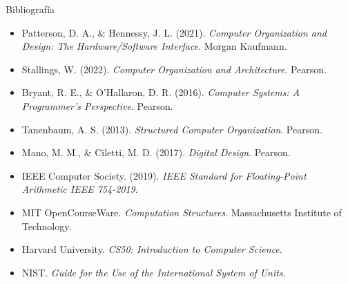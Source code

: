 \documentclass[10pt, aspectratio=169]{beamer}
\begin{document}
	\begin{frame}{Bibliografía}
		
		\tiny
		
		\begin{itemize}
			
			\item Patterson, D. A., \& Hennessy, J. L. (2021). \textit{Computer Organization and Design: The Hardware/Software Interface}. Morgan Kaufmann.
			
			\item Stallings, W. (2022). \textit{Computer Organization and Architecture}. Pearson.
			
			\item Bryant, R. E., \& O'Hallaron, D. R. (2016). \textit{Computer Systems: A Programmer's Perspective}. Pearson.
			
			\item Tanenbaum, A. S. (2013). \textit{Structured Computer Organization}. Pearson.
			
			\item Mano, M. M., \& Ciletti, M. D. (2017). \textit{Digital Design}. Pearson.
			
			\item IEEE Computer Society. (2019). \textit{IEEE Standard for Floating-Point Arithmetic IEEE 754-2019}.
			
			\item MIT OpenCourseWare. \textit{Computation Structures}. Massachusetts Institute of Technology.
			
			\item Harvard University. \textit{CS50: Introduction to Computer Science}.
			
			\item NIST. \textit{Guide for the Use of the International System of Units}.
			
		\end{itemize}
		
	\end{frame}
	
\end{document}
